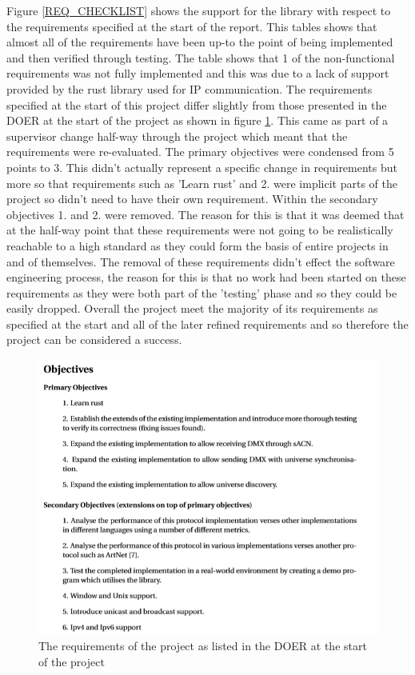 \documentclass[11pt,a4paper]{article}
\begin{document}
Figure \ref{REQ_CHECKLIST} shows the support for the library with respect to the requirements specified at the start of the report. This tables shows that almost all of the requirements have been up-to the point of being implemented and then verified through testing. The table shows that 1 of the non-functional requirements was not fully implemented and this was due to a lack of support provided by the rust library used for IP communication. The requirements specified at the start of this project differ slightly from those presented in the DOER at the start of the project as shown in figure \ref{DOER_REQ}. This came as part of a supervisor change half-way through the project which meant that the requirements were re-evaluated. The primary objectives were condensed from 5 points to 3. This didn't actually represent a specific change in requirements but more so that requirements such as 'Learn rust' and 2. were implicit parts of the project so didn't need to have their own requirement. Within the secondary objectives 1. and 2. were removed. The reason for this is that it was deemed that at the half-way point that these requirements were not going to be realistically reachable to a high standard as they could form the basis of entire projects in and of themselves. The removal of these requirements didn't effect the software engineering process, the reason for this is that no work had been started on these requirements as they were both part of the 'testing' phase and so they could be easily dropped. Overall the project meet the majority of its requirements as specified at the start and all of the later refined requirements and so therefore the project can be considered a success.

\begin{figure}[H]
	\includegraphics[width=\textwidth]{DOER_REQ}
	\caption{The requirements of the project as listed in the DOER at the start of the project}
	\label{DOER_REQ}
\end{figure}
\end{document}
